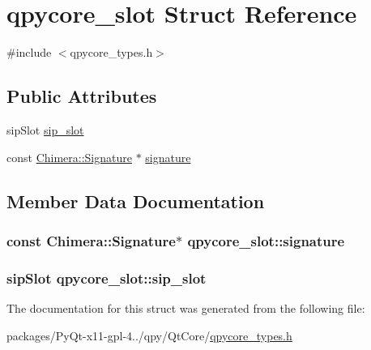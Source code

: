 \hypertarget{structqpycore__slot}{}\section{qpycore\+\_\+slot Struct Reference}
\label{structqpycore__slot}


{\ttfamily \#include $<$qpycore\+\_\+types.\+h$>$}

\subsection*{Public Attributes}
\begin{DoxyCompactItemize}
\item 
sip\+Slot \hyperlink{structqpycore__slot_aa0aafd948ed46cbadb31c9d05bd54129}{sip\+\_\+slot}
\item 
const \hyperlink{classChimera_1_1Signature}{Chimera\+::\+Signature} $\ast$ \hyperlink{structqpycore__slot_a3aae3b76ea7269590c9c4f88b103f07b}{signature}
\end{DoxyCompactItemize}


\subsection{Member Data Documentation}
\hypertarget{structqpycore__slot_a3aae3b76ea7269590c9c4f88b103f07b}{}
\subsubsection[{signature}]{\setlength{\rightskip}{0pt plus 5cm}const {\bf Chimera\+::\+Signature}$\ast$ qpycore\+\_\+slot\+::signature}\label{structqpycore__slot_a3aae3b76ea7269590c9c4f88b103f07b}
\hypertarget{structqpycore__slot_aa0aafd948ed46cbadb31c9d05bd54129}{}
\subsubsection[{sip\+\_\+slot}]{\setlength{\rightskip}{0pt plus 5cm}sip\+Slot qpycore\+\_\+slot\+::sip\+\_\+slot}\label{structqpycore__slot_aa0aafd948ed46cbadb31c9d05bd54129}


The documentation for this struct was generated from the following file\+:\begin{DoxyCompactItemize}
\item 
packages/\+Py\+Qt-\/x11-\/gpl-\/4../qpy/\+Qt\+Core/\hyperlink{qpycore__types_8h}{qpycore\+\_\+types.\+h}\end{DoxyCompactItemize}

